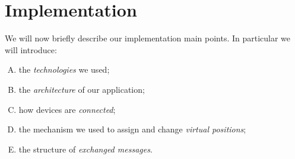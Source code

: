 \section{Implementation}

We will now briefly describe our implementation main points. In particular we will introduce:
	\begin{enumerate}[A.]
		\item the \textit{technologies} we used;
		\item the \textit{architecture} of our application;
		\item how devices are \textit{connected};
		\item the mechanism we used to assign and change \textit{virtual positions};
		\item the structure of \textit{exchanged messages}.
	\end{enumerate}





